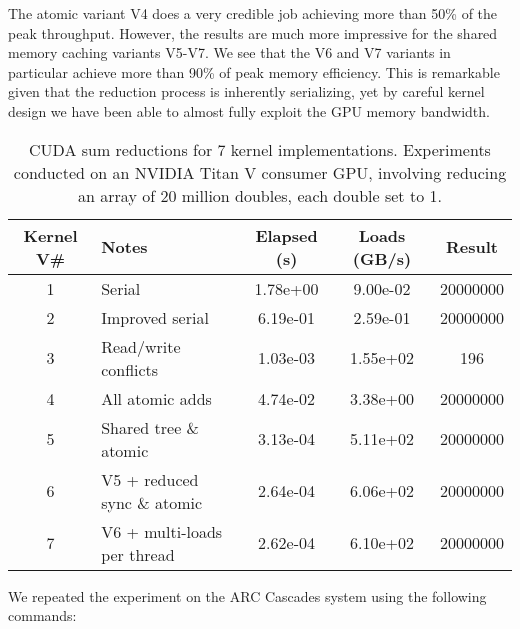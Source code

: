 The atomic variant V4 does a very credible job achieving more than 50\% of the peak throughput. However, the results are much more impressive for the shared memory caching variants V5-V7. We see that the V6 and V7 variants in particular achieve more than 90\% of peak memory efficiency. This is remarkable given that the reduction process is inherently serializing, yet by careful kernel design we have been able to almost fully exploit the GPU memory bandwidth.

\begin{table}[htbp!]
    \centering
    \begin{tabular}{c|l|c|c|c} \hline
    Kernel V\# & Notes & Elapsed (s) & Loads (GB/s) & Result \\ \hline
1 &  Serial & 1.78e+00 &   9.00e-02 &   20000000 \\ 
2 & Improved serial &  6.19e-01 &   2.59e-01 &   20000000 \\ 
3 & Read/write conflicts &  1.03e-03 &   1.55e+02 &   196 \\ 
4 & All atomic adds &  4.74e-02 &   3.38e+00 &   20000000 \\ 
5 & Shared tree \& atomic &  3.13e-04 &   5.11e+02 &   20000000 \\ 
6 & V5 + reduced sync \& atomic &  2.64e-04 &   6.06e+02 &   20000000 \\ 
7 & V6 + multi-loads per thread &  2.62e-04 &   6.10e+02 &   20000000 \\ 
  \hline
    \end{tabular}
    \caption{CUDA sum reductions for 7 kernel implementations. Experiments conducted on an NVIDIA Titan V consumer GPU, involving reducing an array of 20 million doubles, each double set to 1.}
    \label{CUDAreductionsPerformanceTitanV.tab}
\end{table}

We repeated the experiment on the ARC Cascades system using the following commands:


